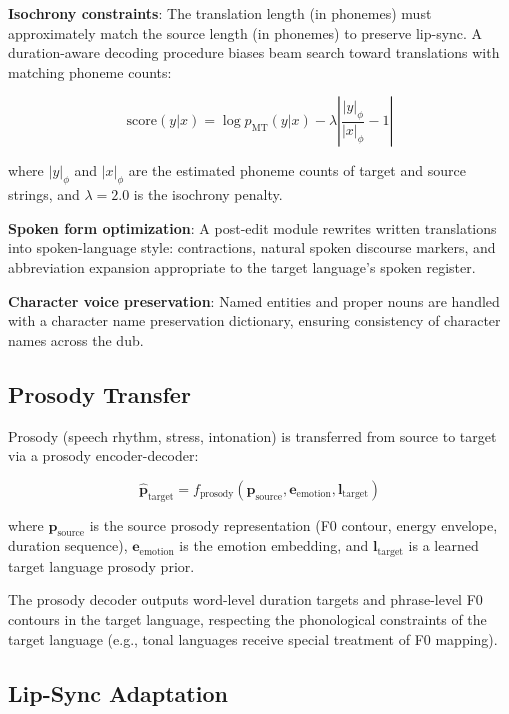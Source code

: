 \documentclass[11pt,a4paper]{article}
\begin{document}
\textbf{Isochrony constraints}: The translation length (in phonemes) must approximately
match the source length (in phonemes) to preserve lip-sync. A duration-aware
decoding procedure biases beam search toward translations with matching phoneme counts:

\begin{equation}
\text{score}(y | x) = \log p_{\text{MT}}(y | x) - \lambda \left| \frac{|y|_{\phi}}{|x|_{\phi}} - 1 \right|
\end{equation}

where $|y|_\phi$ and $|x|_\phi$ are the estimated phoneme counts of target and source
strings, and $\lambda = 2.0$ is the isochrony penalty.

\textbf{Spoken form optimization}: A post-edit module rewrites written translations
into spoken-language style: contractions, natural spoken discourse markers, and
abbreviation expansion appropriate to the target language's spoken register.

\textbf{Character voice preservation}: Named entities and proper nouns are handled
with a character name preservation dictionary, ensuring consistency of character
names across the dub.

\subsection{Prosody Transfer}

Prosody (speech rhythm, stress, intonation) is transferred from source to target
via a prosody encoder-decoder:

\begin{equation}
\hat{\mathbf{p}}_{\text{target}} = f_{\text{prosody}}\!\left(\mathbf{p}_{\text{source}}, \mathbf{e}_{\text{emotion}}, \mathbf{l}_{\text{target}}\right)
\end{equation}

where $\mathbf{p}_{\text{source}}$ is the source prosody representation (F0 contour,
energy envelope, duration sequence), $\mathbf{e}_{\text{emotion}}$ is the emotion
embedding, and $\mathbf{l}_{\text{target}}$ is a learned target language prosody prior.

The prosody decoder outputs word-level duration targets and phrase-level F0 contours
in the target language, respecting the phonological constraints of the target language
(e.g., tonal languages receive special treatment of F0 mapping).

\subsection{Lip-Sync Adaptation}
\end{document}
